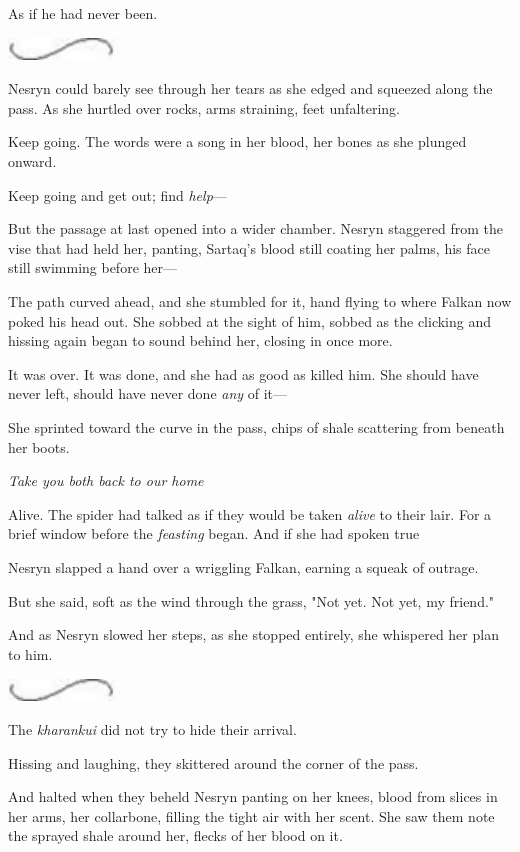 As if he had never been.

\includegraphics[width=1.12in,height=0.24in]{images/seperator}

Nesryn could barely see through her tears as she edged and squeezed along the pass. As she hurtled over rocks, arms straining, feet unfaltering.

Keep going. The words were a song in her blood, her bones as she plunged onward.

Keep going and get out; find \emph{help}---

But the passage at last opened into a wider chamber. Nesryn staggered from the vise that had held her, panting, Sartaq's blood still coating her palms, his face still swimming before her---

The path curved ahead, and she stumbled for it, hand flying to where Falkan now poked his head out. She sobbed at the sight of him, sobbed as the clicking and hissing again began to sound behind her, closing in once more.

It was over. It was done, and she had as good as killed him. She should have never left, should have never done \emph{any} of it---

She sprinted toward the curve in the pass, chips of shale scattering from beneath her boots.

\emph{Take you both back to our home }

Alive. The spider had talked as if they would be taken \emph{alive} to their lair. For a brief window before the \emph{feasting} began. And if she had spoken true 

Nesryn slapped a hand over a wriggling Falkan, earning a squeak of outrage.

But she said, soft as the wind through the grass, "Not yet. Not yet, my friend."

And as Nesryn slowed her steps, as she stopped entirely, she whispered her plan to him.

\includegraphics[width=1.12in,height=0.24in]{images/seperator}

The \emph{kharankui} did not try to hide their arrival.

Hissing and laughing, they skittered around the corner of the pass.

And halted when they beheld Nesryn panting on her knees, blood from slices in her arms, her collarbone, filling the tight air with her scent. She saw them note the sprayed shale around her, flecks of her blood on it.

